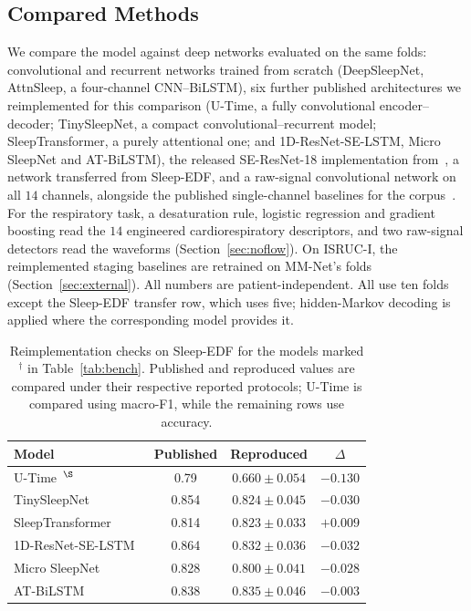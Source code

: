 \documentclass[a4paper,fleqn]{cas-sc}
\begin{document}
\subsection{Compared Methods}
We compare the model against deep networks evaluated on the same folds: convolutional and
recurrent networks trained from scratch (DeepSleepNet, AttnSleep, a four-channel CNN--BiLSTM),
six further published architectures we reimplemented for this comparison (U-Time, a
fully convolutional encoder--decoder; TinySleepNet, a compact convolutional--recurrent model;
SleepTransformer, a purely attentional one; and 1D-ResNet-SE-LSTM, Micro SleepNet and
AT-BiLSTM), the released SE-ResNet-18 implementation from~\cite{bose2026gap}, a
network transferred from Sleep-EDF, and a raw-signal convolutional network on all $14$ channels,
alongside the published single-channel baselines for the corpus~\cite{maiti2026isleeps}. For the
respiratory task, a desaturation rule, logistic regression and gradient boosting read the $14$
engineered cardiorespiratory descriptors, and two raw-signal detectors read the waveforms
(Section~\ref{sec:noflow}). On ISRUC-I, the reimplemented staging baselines are retrained on
MM-Net's folds (Section~\ref{sec:external}). All numbers are
patient-independent. All use ten folds except the Sleep-EDF transfer row, which uses five; hidden-Markov decoding is applied where the corresponding model provides it.

\begin{table}[H]
\caption{Reimplementation checks on Sleep-EDF for the models marked $^{\dagger}$ in Table~\ref{tab:bench}. Published and reproduced values are compared under their respective reported protocols; U-Time is compared using macro-F1, while the remaining rows use accuracy.}
\label{tab:reimpl}
\centering
\begin{tabular}{@{}l c c c@{}}
\toprule
Model & Published & Reproduced & $\Delta$ \\
\midrule
U-Time~\cite{perslev2019utime}$^{\S}$ & 0.79 & $0.660 \pm 0.054$ & $-0.130$ \\
TinySleepNet~\cite{supratak2020tinysleepnet} & 0.854 & $0.824 \pm 0.045$ & $-0.030$ \\
SleepTransformer~\cite{sleeptransformer2022} & 0.814 & $0.823 \pm 0.033$ & $+0.009$ \\
1D-ResNet-SE-LSTM~\cite{li2023resnetselstm} & 0.864 & $0.832 \pm 0.036$ & $-0.032$ \\
Micro SleepNet~\cite{liu2023microsleepnet} & 0.828 & $0.800 \pm 0.041$ & $-0.028$ \\
AT-BiLSTM~\cite{fu2021atbilstm} & 0.838 & $0.835 \pm 0.046$ & $-0.003$ \\
\bottomrule
\end{tabular}
\end{table}
\end{document}
